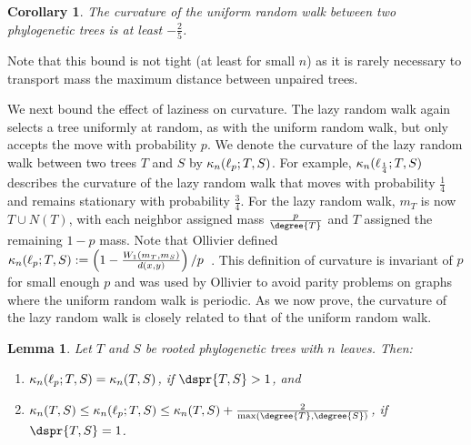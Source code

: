 \documentclass[11pt,onecolumn,conference]{IEEEtran}
\newtheorem{lemma}[theorem]{Lemma}
\newtheorem{corollary}[theorem]{Corollary}
\newcommand{\curvature}[2][]{%
    \ifthenelse{\equal{#1}{}}%
		{\kappa_n(#2)}%
		{\kappa_n(#1;#2)}%
}
\begin{document}
\begin{corollary}
	The curvature of the uniform random walk between two phylogenetic trees is at least $-\frac{2}{5}$.
\end{corollary}

Note that this bound is not tight (at least for small $n$) as it is rarely necessary to transport mass the maximum distance between unpaired trees.

We next bound the effect of laziness on curvature.
The lazy random walk again selects a tree uniformly at random, as with the uniform random walk, but only accepts the move with probability $p$.
We denote the curvature of the lazy random walk between two trees $T$ and $S$ by $\curvature[\ell_p]{T,S}$.
For example, $\curvature[\ell_{\frac{1}{4}}]{T,S}$ describes the curvature of the lazy random walk that moves with probability $\frac{1}{4}$ and remains stationary with probability $\frac{3}{4}$.
For the lazy random walk, $m_T$ is now $T \cup N(T)$, with each neighbor assigned mass $\frac{p}{\degree{T}}$ and $T$ assigned the remaining $1 - p$ mass.
Note that Ollivier defined $\curvature[\ell_p]{T, S} := \left(1 - \frac{W_1(m_T, m_S)}{d(x, y)}\right) / p$~\cite{Ollivier2009-bw}.
This definition of curvature is invariant of $p$ for small enough $p$ and was used by Ollivier to avoid parity problems on graphs where the uniform random walk is periodic.
As we now prove, the curvature of the lazy random walk is closely related to that of the uniform random walk.

\begin{lemma}
	Let $T$ and $S$ be rooted phylogenetic trees with $n$ leaves.
	Then:
	\begin{enumerate}
		\item	$\curvature[\ell_p]{T,S} = \curvature{T,S}$, if $\dspr{T,S} > 1$, and
		\item	$\curvature{T,S} \le \curvature[\ell_p]{T,S} \le \curvature{T,S} + \frac{2}{\max(\degree{T}, \degree{S})}$, if $\dspr{T,S} = 1$.
	\end{enumerate}
\end{lemma}
\end{document}
